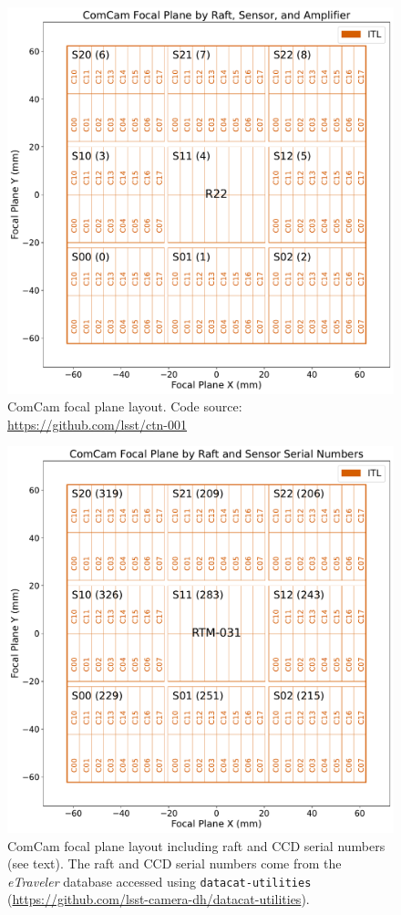 \documentclass[CTN,authoryear,toc]{lsstdoc}
\begin{document}
\begin{figure}
  \centering
  \includegraphics[width=\textwidth]{figures/ComCam_focal_plane_CTN_001_FIG1.pdf}
  \caption{ComCam focal plane layout. Code source: \url{https://github.com/lsst/ctn-001}}
  \label{fig:comcam_focal_plane_1}
\end{figure}

\clearpage

\begin{figure}
  \centering
  \includegraphics[width=\textwidth]{figures/ComCam_focal_plane_CTN_001_FIG2.pdf}
	\caption{ComCam focal plane layout including raft and CCD serial numbers (see text). The raft and CCD serial numbers come from the \emph{eTraveler} database accessed using {\tt{datacat-utilities}} (\url{https://github.com/lsst-camera-dh/datacat-utilities}).}
  \label{fig:comcam_focal_plane_2}
\end{figure}
\end{document}

